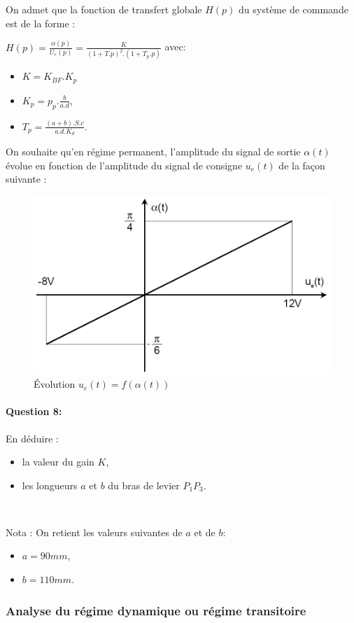 On admet que la fonction de transfert globale $H(p)$ du système de commande est de la forme :

$H(p)=\frac{\alpha(p)}{U_e(p)}=\frac{K}{(1+T.p)^2.(1+T_p.p)}$ avec:

\begin{itemize}
 \item $K=K_{BF}.K_p$
 \item $K_p=p_p.\frac{b}{a.d}$,
 \item $T_p=\frac{(a+b).S.c}{a.d.K_d}$.
\end{itemize}

On souhaite qu'en régime permanent, l'amplitude du signal de sortie $\alpha(t)$ évolue en fonction de l'amplitude du signal de consigne $u_e(t)$ de la façon suivante :

\begin{figure}[!h]
\centering\includegraphics[width=0.5\linewidth]{img/Tracteur26.png}
\caption{Évolution $u_e(t)=f(\alpha(t))$}
\label{fig26}
\end{figure}

\paragraph{Question 8:} En déduire :

\begin{itemize}
 \item la valeur du gain $K$,
 \item les longueurs $a$ et $b$ du bras de levier $P_{1}P_{3}$.
\end{itemize}

~\

Nota : On retient les valeurs suivantes de $a$ et de $b$:
\begin{itemize}
 \item $a=90mm$,
 \item $b=110mm$.
\end{itemize} 

\subsubsection{Analyse du régime dynamique ou régime transitoire}

